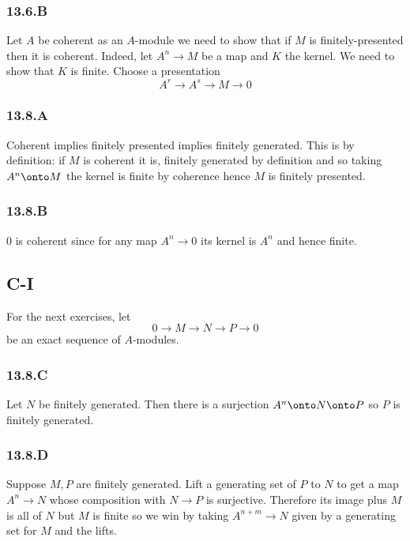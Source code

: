 \documentclass[12pt]{article}
\theoremstyle{plain}
\begin{document}
\subsubsection{13.6.B}

Let $A$ be coherent as an $A$-module we need to show that if $M$ is finitely-presented then it is coherent. Indeed, let $A^n \to M$ be a map and $K$ the kernel. We need to show that $K$ is finite. Choose a presentation 
\[ A^r \to A^s \to M \to 0 \]

\subsubsection{13.8.A}

Coherent implies finitely presented implies finitely generated. This is by definition: if $M$ is coherent it is, finitely generated by definition and so taking $A^n \onto M$ the kernel is finite by coherence hence $M$ is finitely presented.

\subsubsection{13.8.B}

$0$ is coherent since for any map $A^n \to 0$ its kernel is $A^n$ and hence finite.

\subsection{C-I}

For the next exercises, let
\[ 0 \to M \to N \to P \to 0 \]
be an exact sequence of $A$-modules.

\subsubsection{13.8.C}

 Let $N$ be finitely generated. Then there is a surjection $A^n \onto N \onto P$ so $P$ is finitely generated.
 
\subsubsection{13.8.D}

Suppose $M,P$ are finitely generated. Lift a generating set of $P$ to $N$ to get a map $A^n \to N$ whose composition with $N \to P$ is surjective. Therefore its image plus $M$ is all of $N$ but $M$ is finite so we win by taking $A^{n+m} \to N$ given by a generating set for $M$ and the lifts.
\end{document}

